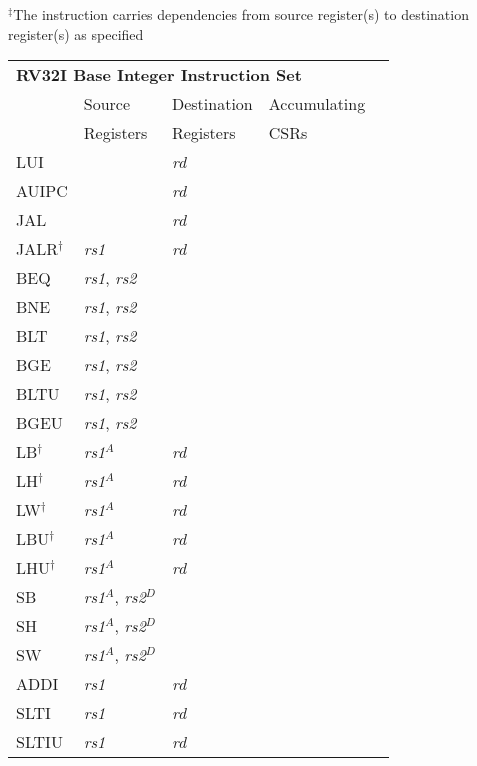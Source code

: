 $^\ddagger$The instruction carries dependencies from source register(s) to destination register(s) as specified

\begin{tabular}{p{3cm}|p{25mm}|p{3cm}|p{4cm}|p{4cm}}
  \multicolumn{4}{l}{\bf RV32I Base Integer Instruction Set} \\
  \cline{2-4}
   & Source    & Destination & Accumulating \\
   & Registers & Registers   & CSRs \\
  \cline{2-4}
   LUI &  & {\em rd} &   & \\
   \cline{2-4}
   AUIPC &  & {\em rd} &   & \\
   \cline{2-4}
   JAL &  & {\em rd} &  & \\
   \cline{2-4}
   JALR$^\dagger$ & {\em rs1} & {\em rd} &  & \\
   \cline{2-4}
   BEQ & {\em rs1}, {\em rs2} &  &   & \\
   \cline{2-4}
   BNE & {\em rs1}, {\em rs2} &  &   & \\
   \cline{2-4}
   BLT & {\em rs1}, {\em rs2} &  &   & \\
   \cline{2-4}
   BGE & {\em rs1}, {\em rs2} &  &   & \\
   \cline{2-4}
   BLTU & {\em rs1}, {\em rs2} &  &   & \\
   \cline{2-4}
   BGEU & {\em rs1}, {\em rs2} &  &   & \\
   \cline{2-4}
   LB$^\dagger$ & {\em rs1}$^A$ & {\em rd} &   & \\
   \cline{2-4}
   LH$^\dagger$ & {\em rs1}$^A$ & {\em rd} &   & \\
   \cline{2-4}
   LW$^\dagger$ & {\em rs1}$^A$ & {\em rd} &   & \\
   \cline{2-4}
   LBU$^\dagger$ & {\em rs1}$^A$ & {\em rd} &   & \\
   \cline{2-4}
   LHU$^\dagger$ & {\em rs1}$^A$ & {\em rd} &   & \\
   \cline{2-4}
   SB & {\em rs1}$^A$, {\em rs2}$^D$ &  &   & \\
   \cline{2-4}
   SH & {\em rs1}$^A$, {\em rs2}$^D$ &  &   & \\
   \cline{2-4}
   SW & {\em rs1}$^A$, {\em rs2}$^D$ &  &   & \\
   \cline{2-4}
   ADDI & {\em rs1} & {\em rd} &   & \\
   \cline{2-4}
   SLTI & {\em rs1} & {\em rd} &   & \\
   \cline{2-4}
   SLTIU & {\em rs1} & {\em rd} &   & \\

\end{tabular}
